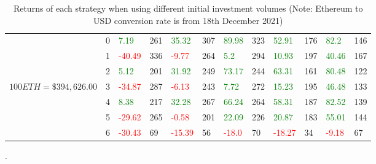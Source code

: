 \begin{table}[htb!]
\begin{adjustwidth}{-0.9in}{-0.9in}
\begin{tabular}{|p{5em}|p{2em}|p{3em}|p{3em}|p{3em}|p{3em}|p{3em}|p{3em}|p{3em}|p{3em}|p{3em}|p{3em}|}
            & 0 & \textcolor{green}{7.19} & 261 & \textcolor{green}{35.32} & 307 & \textcolor{green}{89.98} & 323 & \textcolor{green}{52.91} & 176 & \textcolor{green}{82.2} & 146\\\cline{3-12}
            & 1 & \textcolor{red}{-40.49} & 336 & \textcolor{red}{-9.77} & 264 & \textcolor{green}{5.2} & 294 & \textcolor{green}{10.93} & 197 & \textcolor{green}{40.46} & 167\\\cline{3-12}
            & 2 & \textcolor{green}{5.12} & 201 & \textcolor{green}{31.92} & 249 & \textcolor{green}{73.17} & 244 & \textcolor{green}{63.31} & 161 & \textcolor{green}{80.48} & 122\\\cline{3-12}
            $100 ETH = \$394,626.00$ & 3 & \textcolor{red}{-34.87} & 287 & \textcolor{red}{-6.13} & 243 & \textcolor{green}{7.72} & 272 & \textcolor{green}{15.23} & 195 & \textcolor{green}{46.48} & 133\\[-3ex]\cline{3-12}
            & 4 & \textcolor{green}{8.38} & 217 & \textcolor{green}{32.28} & 267 & \textcolor{green}{66.24} & 264 & \textcolor{green}{58.31} & 187 & \textcolor{green}{82.52} & 139\\\cline{3-12}
            & 5 & \textcolor{red}{-29.62} & 265 & \textcolor{red}{-0.58} & 201 & \textcolor{green}{22.09} & 226 & \textcolor{green}{20.87} & 183 & \textcolor{green}{55.01} & 144\\\cline{3-12}
            & 6 & \textcolor{red}{-30.43} & 69 & \textcolor{red}{-15.39} & 56 & \textcolor{red}{-18.0} & 70 & \textcolor{red}{-18.27} & 34 & \textcolor{red}{-9.18} & 67\\\hline
        \end{tabular}
    \end{adjustwidth}
    \caption{Returns of each strategy when using different initial investment volumes (Note: Ethereum to USD conversion rate is from 18th December 2021) \label{tab:VaryInitialInvestments}}.
\end{table}

